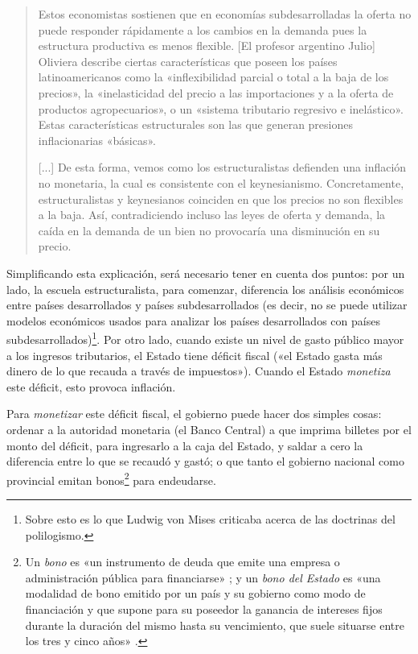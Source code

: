 \documentclass[12pt,a4paper,twoside]{book}
\begin{document}
\begin{quotation}
Estos economistas sostienen que en economías subdesarrolladas la oferta no puede responder rápidamente a los cambios en la demanda pues la estructura productiva es menos flexible. [El profesor argentino Julio] Oliviera describe ciertas características que poseen los países latinoamericanos como la «inflexibilidad parcial o total a la baja de los precios», la «inelasticidad del precio a las importaciones y a la oferta de productos agropecuarios», o un «sistema tributario regresivo e inelástico». Estas características estructurales son las que generan presiones inflacionarias «básicas».

[...] De esta forma, vemos como los estructuralistas defienden una inflación no monetaria, la cual es consistente con el keynesianismo. Concretamente, estructuralistas y keynesianos coinciden en que los precios no son flexibles a la baja. Así, contradiciendo incluso las leyes de oferta y demanda, la caída en la demanda de un bien no provocaría una disminución en su precio. \cite[pág. 467-468]{elementos-econopol}
\end{quotation}

Simplificando esta explicación, será necesario tener en cuenta dos puntos: por un lado, la escuela estructuralista, para comenzar, diferencia los análisis económicos entre países desarrollados y países subdesarrollados (es decir, no se puede utilizar modelos económicos usados para analizar los países desarrollados con países subdesarrollados)\footnote{Sobre esto es lo que Ludwig von Mises criticaba acerca de las doctrinas del polilogismo.}. Por otro lado, cuando existe un nivel de gasto público mayor a los ingresos tributarios, el Estado tiene déficit fiscal («el Estado gasta más dinero de lo que recauda a través de impuestos»). Cuando el Estado \textit{monetiza} este déficit, esto provoca inflación.

Para \textit{monetizar} este déficit fiscal, el gobierno puede hacer dos simples cosas: ordenar a la autoridad monetaria (el Banco Central) a que imprima billetes por el monto del déficit, para ingresarlo a la caja del Estado, y saldar a cero la diferencia entre lo que se recaudó y gastó; o que tanto el gobierno nacional como provincial  emitan bonos\footnote{Un \textit{bono} es «un instrumento de deuda que emite una empresa o administración pública para financiarse» \cite{epedia:bono}; y un \textit{bono del Estado} es «una modalidad de bono emitido por un país y su gobierno como modo de financiación y que supone para su poseedor la ganancia de intereses fijos durante la duración del mismo hasta su vencimiento, que suele situarse entre los tres y cinco años» \cite{epedia:bono-estado}.} para endeudarse.
\end{document}
